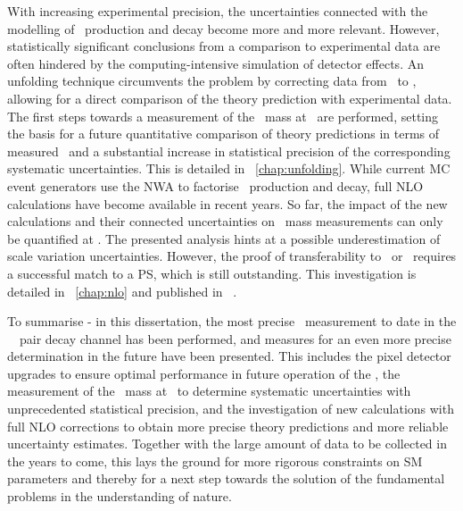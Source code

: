 With increasing experimental precision, the uncertainties connected with the modelling of \tquark\ production and decay become more and more relevant. However, statistically significant conclusions from a comparison to experimental data are often hindered by the computing-intensive simulation of detector effects. An unfolding technique circumvents the problem by correcting data from \recolevel\ to \stablevel, allowing for a direct comparison of the theory prediction with experimental data. The first steps towards a measurement of the \tquark\ mass at \stablevel\ are performed, setting the basis for a future quantitative comparison of theory predictions in terms of measured \mt\ and a substantial increase in statistical precision of the corresponding systematic uncertainties. This is detailed in \chap~\ref{chap:unfolding}.
%
%
While current \gls{MC} event generators use the \gls{NWA} to factorise \tquark\ production and decay, full \gls{NLO} calculations have become available in recent years. So far, the impact of the new calculations and their connected uncertainties on \tquark\ mass measurements can only be quantified at \genlevel. The presented analysis hints at a possible underestimation of scale variation uncertainties. However, the proof of transferability to \stablevel\ or \recolevel\ requires a successful match to a \gls{PS}, which is still outstanding. This investigation is detailed in \chap~\ref{chap:nlo} and published in ~\cite{Heinrich2014}.


To summarise - in this dissertation, the most precise \mt\ measurement to date in the \dileptonic\ \tquark\ pair decay channel has been performed, and measures for an even more precise determination in the future have been presented.
%
This includes the pixel detector upgrades to ensure optimal performance in future operation of the ,
%
the measurement of the \tquark\ mass at \stablevel\ to determine systematic uncertainties with unprecedented statistical precision, and 
the investigation of new calculations with full \gls{NLO}  corrections to obtain more precise theory predictions and more reliable uncertainty estimates.
%
%
Together with the large amount of data to be collected in the years to come, this lays the ground for more rigorous constraints on \gls{SM} parameters
%
and thereby for a next step towards the solution of the fundamental problems in the understanding of nature. 


